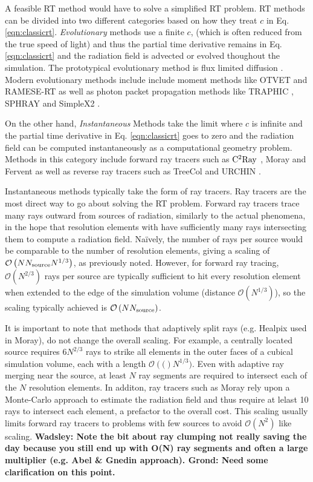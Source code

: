 \documentclass[fleq,usenatbib]{mnras}
\newcommand{\bigO}[1]{\mathcal{O}\left(#1\right)}
\newcommand{\comment}[1]{\textbf{\color{red}#1}}
\newcommand{\NS}{N_{\rm source}}
\begin{document}
A feasible RT method would have to solve a simplified RT problem.
RT methods can be divided into two different categories 
based on how they treat $c$ in Eq. \ref{eqn:classicrt}.  {\it Evolutionary} methods use a 
finite $c$, (which is often reduced from the true speed of light) and thus the partial time 
derivative remains in Eq. \ref{eqn:classicrt} and the radiation field 
is advected or evolved thoughout the simulation.  The prototypical evolutionary method
is flux limited diffusion \citep{levermorepomranging81 http://adsabs.harvard.edu/full/1981ApJ...248..321L}.  Modern evolutionary methods include include moment methods like OTVET 
\citep{gnedinAbel01} and  RAMESE-RT \citep{rosdahlTeyssier15} as well as 
photon packet propagation methods like TRAPHIC \citep{pawlikSchaye08}, SPHRAY 
\citep{altayEt08} and SimpleX2 \citep{paardekooperEt10}.

On the other hand, {\it Instantaneous} Methods take the 
limit where $c$ is infinite and the partial time derivative in 
Eq. \ref{eqn:classicrt} goes to zero and the radiation field can be 
computed instantaneously as a computational geometry problem.  Methods in this category
include forward ray tracers such as $\rm C^2Ray$ 
\citep{mellemaEt06a}, Moray \citep{wiseAbel11} and Fervent 
\citep{baczynskiEt15} as well as reverse ray tracers such as TreeCol 
\citep{clarkEt12} and URCHIN \citep{altayTheuns13}. 

Instantaneous methods typically take the form of ray tracers. Ray tracers are 
the most direct way to go about solving the RT problem. Forward ray 
tracers trace many rays outward from sources of radiation, similarly to the 
actual phenomena, in the hope that resolution elements with have sufficiently many rays
intersecting them to compute a radiation field.
Na\"ively, the number of rays per 
source would be comparable to the number of resolution elements, giving a scaling 
of $\bigO{N \NS N^{1/3}}$, as previously noted.
However, for forward ray tracing, $\bigO{N^{2/3}}$ rays per source are typically sufficient to hit every resolution element when extended to the edge of the simulation volume (distance $\bigO{N^{1/3}}$), so the scaling typically achieved is $\bigO{N \NS}$.  

It is important to note that methods that adaptively split rays (e.g. Healpix \citep{Gorski2005 http://adsabs.harvard.edu/abs/2005ApJ...622..759G} used in Moray), do not change the overall scaling.  For example, a centrally located source requires $6 N^{2/3}$ rays to strike all elements in the outer faces of a cubical simulation volume, each with a length $\bigO(N^{1/3})$.
Even with adaptive ray merging near the source, at least $N$ ray segments are required to intersect each of the $N$ resolution elements.
In additon, ray tracers such as Moray rely upon a Monte-Carlo approach to estimate the radiation field and thus require at lelast 10 rays to intersect each element, a prefactor to the overall cost.
This scaling usually limits forward ray tracers to 
problems with few sources to avoid $\mathcal{O}(N^2)$ like scaling. 
\comment{Wadsley: Note the bit about ray clumping not really saving 
the day because you still end up with O(N) ray segments and often a large 
multiplier (e.g. Abel \& Gnedin approach). Grond: Need some clarification on 
this point.}
\end{document}
